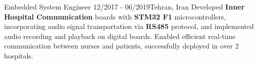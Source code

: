 \resumeSubheadingReza
{Embedded System Engineer}{}
{12/2017 - 06/2019}{Tehran, Iran}
{
    Developed \textbf{Inner Hospital Communication} boards with \textbf{STM32 F1} microcontrollers, incorporating audio signal transportation via \textbf{RS485} protocol, and implemented audio recording and playback on digital boards. Enabled efficient real-time communication between nurses and patients, successfully deployed in over 2 hospitals.
}

